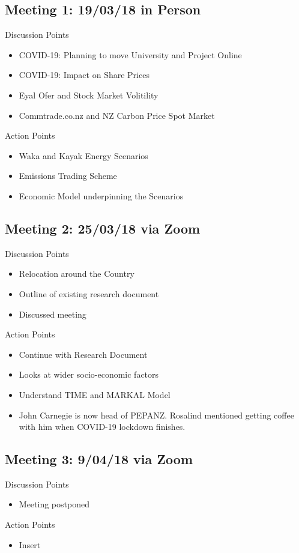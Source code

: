 \documentclass[12pt]{article}
\begin{document}
\subsection{Meeting 1: 19/03/18 in Person}
Discussion Points
    \begin{itemize}
        \item COVID-19: Planning to move University and Project Online
        \item COVID-19: Impact on Share Prices
        \item Eyal Ofer and Stock Market Volitility
        \item Commtrade.co.nz and NZ Carbon Price Spot Market
    \end{itemize}
Action Points
    \begin{itemize}
        \item Waka and Kayak Energy Scenarios
        \item Emissions Trading Scheme
        \item Economic Model underpinning the Scenarios
    \end{itemize}
    \subsection{Meeting 2: 25/03/18 via Zoom}
Discussion Points
    \begin{itemize}
        \item Relocation around the Country
        \item Outline of existing research document
        \item Discussed meeting
    \end{itemize}
Action Points
    \begin{itemize}
        \item Continue with Research Document
        \item Looks at wider socio-economic factors
        \item Understand TIME and MARKAL Model
        \item John Carnegie is now head of PEPANZ. Rosalind 
              mentioned getting coffee with him when COVID-19
              lockdown finishes.
    \end{itemize}
\subsection{Meeting 3: 9/04/18 via Zoom}
Discussion Points
    \begin{itemize}
        \item Meeting postponed 
    \end{itemize}
Action Points
    \begin{itemize}
        \item Insert
    \end{itemize}
\end{document}

